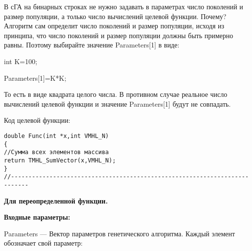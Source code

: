 \documentclass[a4paper,12pt]{article}
\begin{document}
 В сГА на бинарных строках не нужно задавать в параметрах число поколений и размер популяции, а только число вычислений целевой функции. Почему? Алгоритм сам определит число поколений и размер популяции, исходя из принципа, что число поколений и размер популяции должны быть примерно равны. Поэтому выбирайте значение Parameters[1] в виде:

int K=100;

Parameters[1]=K*K;

То есть в виде квадрата целого числа. В противном случае реальное число вычислений целевой функции и значение Parameters[1] будут не совпадать.

Код целевой функции:
\begin{lstlisting}[caption=Оптимизируемая функция]
double Func(int *x,int VMHL_N)
{
//Сумма всех элементов массива
return TMHL_SumVector(x,VMHL_N);
}
//---------------------------------------------------------------------------
\end{lstlisting}

\textbf{Для переопределенной функции.}

\textbf{Входные параметры:}
 
Parameters --- Вектор параметров генетического алгоритма. Каждый элемент обозначает свой параметр:
 
\end{document}

